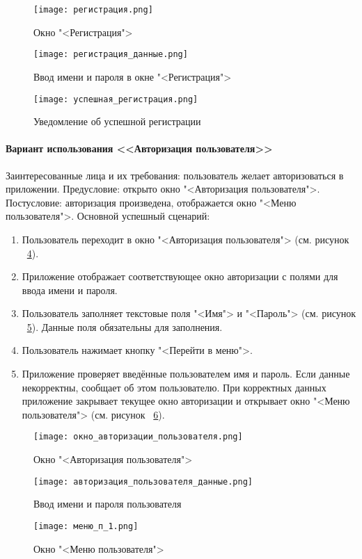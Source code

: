 \newpage
\begin{figure}[ht]
	\centering
	\texttt{[image: регистрация.png]}
	\caption{Окно "<Регистрация">}
	\label{reg_window:image}
\end{figure}
\begin{figure}[ht]
	\centering
	\texttt{[image: регистрация\_данные.png]}
	\caption{Ввод имени и пароля в окне "<Регистрация">}
	\label{reg_data:image}
\end{figure}
\begin{figure}[ht]
	\centering
	\texttt{[image: успешная\_регистрация.png]}
	\caption{Уведомление об успешной регистрации}
	\label{successful_reg:image}
\end{figure}

\paragraph{Вариант использования <<Авторизация пользователя>>}

Заинтересованные лица и их требования: пользователь желает авторизоваться в приложении.
\newline Предусловие: открыто окно "<Авторизация пользователя">.
\newline Постусловие: авторизация произведена, отображается окно "<Меню пользователя">.
\newline Основной успешный сценарий:
\begin{enumerate}
	\item Пользователь переходит в окно "<Авторизация пользователя"> (см. рисунок ~\ref{user_auth_window:image}).
	\item Приложение отображает соответствующее окно авторизации с полями для ввода имени и пароля.
	\item Пользователь заполняет текстовые поля "<Имя"> и "<Пароль"> (см. рисунок ~\ref{user_auth_data:image}). Данные поля обязательны для заполнения.
	\item Пользователь нажимает кнопку "<Перейти в меню">.
	\item Приложение проверяет введённые пользователем имя и пароль. Если данные некорректны, сообщает об этом пользователю. При корректных данных приложение закрывает текущее окно авторизации и открывает окно "<Меню пользователя"> (см. рисунок ~\ref{user_menu_1:image}).
\end{enumerate}

\begin{figure}[H]
	\centering
	\texttt{[image: окно\_авторизации\_пользователя.png]}
	\caption{Окно "<Авторизация пользователя">}
	\label{user_auth_window:image}
\end{figure}
\begin{figure}[H]
	\centering
	\texttt{[image: авторизация\_пользователя\_данные.png]}
	\caption{Ввод имени и пароля пользователя}
	\label{user_auth_data:image}
\end{figure}
\begin{figure}[H]
	\centering
	\texttt{[image: меню\_п\_1.png]}
	\caption{Окно "<Меню пользователя">}
	\label{user_menu_1:image}
\end{figure}

